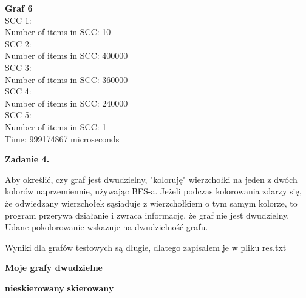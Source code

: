 \documentclass[15pt, a4paper]{article}
\begin{document}
\textbf{Graf 6} \\
SCC 1: \\
Number of items in SCC: 10 \\

SCC 2: \\
Number of items in SCC: 400000 \\

SCC 3: \\
Number of items in SCC: 360000 \\

SCC 4: \\
Number of items in SCC: 240000 \\

SCC 5: \\
Number of items in SCC: 1 \\

Time: 999174867 microseconds \\


\vspace{0.5cm}

\noindent\hrulefill

\vspace{0.5cm}

\noindent\textbf{Zadanie 4.} 

\noindent Aby określić, czy graf jest dwudzielny, "koloruję" wierzchołki na jeden z dwóch kolorów naprzemiennie, używając BFS-a. Jeżeli podczas kolorowania zdarzy się, że odwiedzany wierzchołek sąsiaduje z wierzchołkiem o tym samym kolorze, to program przerywa działanie i zwraca informację, że graf nie jest dwudzielny.   Udane pokolorowanie wskazuje na dwudzielność grafu.

Wyniki dla grafów testowych są długie, dlatego zapisałem je w pliku res.txt

\vspace{0.5cm}

\begin{center}
    \textbf{Moje grafy dwudzielne}
\end{center}

\begin{center}
    \textbf{nieskierowany} \hspace{4cm} \textbf{skierowany}
\end{center}
\end{document}
